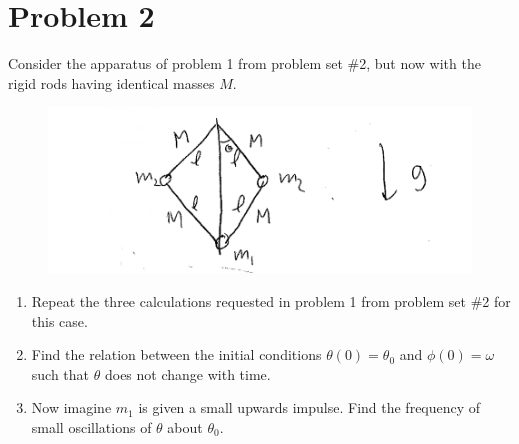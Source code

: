 \documentclass[12pt]{article}
\begin{document}
\section*{Problem 2}
Consider the apparatus of problem 1 from problem set \#2, but now with the rigid rods having identical masses $M$.
\begin{figure}[H]
    \includegraphics{Problem2}
    \centering
\end{figure}
\begin{enumerate}[label=(\alph*)]
    \item Repeat the three calculations requested in problem 1 from problem set \#2 for this case.
    \item Find the relation between the initial conditions $\theta(0)=\theta_0$ and $\phi(0)=\omega$ such that $\theta$ does not change with time.
    \item Now imagine $m_1$ is given a small upwards impulse. Find the frequency of small oscillations of $\theta$ about $\theta_0$.
\end{enumerate}
\end{document}
